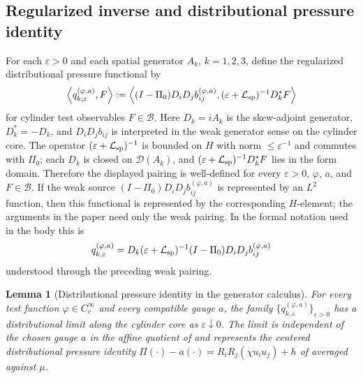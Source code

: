\documentclass[11pt]{amsart}
\numberwithin{equation}{section}
\theoremstyle{plain}
\newtheorem{lemma}[lemma]{Lemma}
\theoremstyle{definition}
\theoremstyle{remark}
\begin{document}
\subsection{Regularized inverse and distributional pressure identity}
For each \(\varepsilon>0\) and each spatial generator \(A_k\),
\(k=1,2,3\), define the
regularized distributional pressure functional by
\[
   \left\langle q_{k,\varepsilon}^{(\varphi,a)},F\right\rangle
   :=
   \left\langle
      (I-\Pi_0)D_iD_j b_{ij}^{(\varphi,a)},
      (\varepsilon+\mathcal L_{\rm sp})^{-1}D_k^*F
   \right\rangle
\]
for cylinder test observables \(F\in\mathcal B\).  Here \(D_k=iA_k\) is the
skew-adjoint generator, \(D_k^*=-D_k\), and \(D_iD_jb_{ij}\) is interpreted in
the weak generator sense on the cylinder core.  The operator
\((\varepsilon+\mathcal L_{\rm sp})^{-1}\) is bounded on \(H\) with
norm \(\le\varepsilon^{-1}\) and commutes with \(\Pi_0\); each \(D_k\) is
closed on \(\mathcal D(A_k)\), and
\((\varepsilon+\mathcal L_{\rm sp})^{-1}D_k^*F\) lies in the form domain.  Therefore the
displayed pairing is well-defined for every \(\varepsilon>0\), \(\varphi\),
\(a\), and \(F\in\mathcal B\).  If the weak source
\((I-\Pi_0)D_iD_jb_{ij}^{(\varphi,a)}\) is represented by an \(L^2\) function,
then this functional is represented by the corresponding \(H\)-element; the
arguments in the paper need only the weak pairing.
In the formal notation used in the body this is
\[
   q_{k,\varepsilon}^{(\varphi,a)}
   =
   D_k(\varepsilon+\mathcal L_{\rm sp})^{-1}
   (I-\Pi_0)D_iD_jb_{ij}^{(\varphi,a)}
\]
understood through the preceding weak pairing.

\begin{lemma}[Distributional pressure identity in the generator calculus]
\label{lem:generator-pressure-identity}
For every test function \(\varphi\in C_c^\infty\) and every compatible
gauge \(a\), the family
\(\{q_{k,\varepsilon}^{(\varphi,a)}\}_{\varepsilon>0}\) has a distributional
limit along the cylinder core as \(\varepsilon\downarrow0\).  The limit is
independent of the chosen gauge \(a\) in the affine quotient of
 and represents the centered
distributional pressure identity
\(\Pi(\cdot)-a(\cdot)=R_iR_j(\chi u_i u_j)+h\) of
 averaged against \(\mu\).
\end{lemma}
\end{document}
